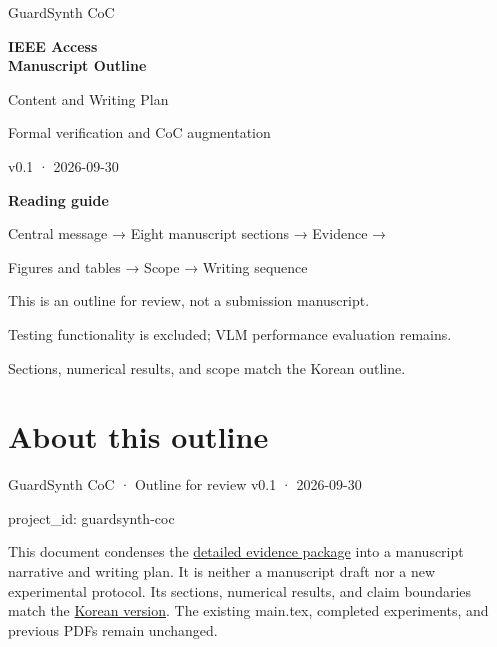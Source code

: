 \documentclass[11pt,a4paper]{article}
\begin{document}
\begin{titlepage}
\vspace*{20mm}
{\color{navy}\Large GuardSynth CoC\par}
\vspace{10mm}
{\huge\bfseries IEEE Access\\[4mm]Manuscript Outline\par}
\vspace{12mm}
{\Large Content and Writing Plan\par}
\vspace{6mm}
Formal verification and CoC augmentation\par
v0.1 · 2026-09-30\par
\vspace{12mm}
\textbf{Reading guide}\par
Central message → Eight manuscript sections → Evidence →\par
Figures and tables → Scope → Writing sequence\par
\vfill
This is an outline for review, not a submission manuscript.\par
Testing functionality is excluded; VLM performance evaluation remains.\par
Sections, numerical results, and scope match the Korean outline.\par
\end{titlepage}
\tableofcontents
\clearpage
\section*{About this outline}


GuardSynth CoC · Outline for review v0.1 · 2026-09-30\par

project\_\allowbreak{}id: {\ttfamily\small guardsynth-coc}\par

This document condenses the \href{\detokenize{../../../../../../projects/04-guardsynth-coc/paper/GUARDSYNTH_COC_METHODS_SETTINGS_PACKAGE_V01_KO.md}}{detailed evidence package} into a manuscript narrative and writing plan. It is neither a manuscript draft nor a new experimental protocol. Its sections, numerical results, and claim boundaries match the \href{\detokenize{../../../../../../projects/04-guardsynth-coc/paper/IEEE_ACCESS_MANUSCRIPT_OUTLINE_V01_KO.md}}{Korean version}. The existing main.tex, completed experiments, and previous PDFs remain unchanged.\par
\end{document}
